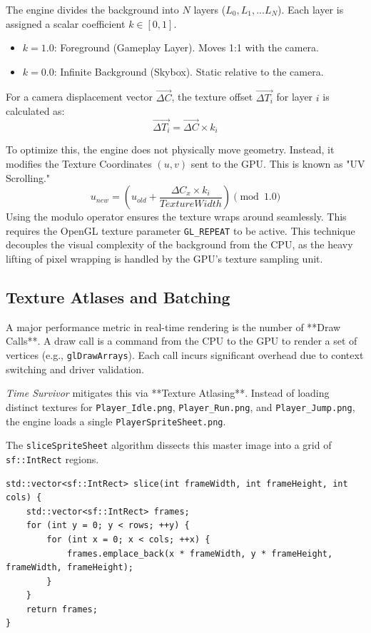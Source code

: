 \documentclass[10pt, a4paper]{article}
\begin{document}
The engine divides the background into $N$ layers ($L_0, L_1, ... L_N$). Each layer is assigned a scalar coefficient $k \in [0, 1]$.
\begin{itemize}
    \item $k=1.0$: Foreground (Gameplay Layer). Moves 1:1 with the camera.
    \item $k=0.0$: Infinite Background (Skybox). Static relative to the camera.
\end{itemize}

For a camera displacement vector $\vec{\Delta C}$, the texture offset $\vec{\Delta T_i}$ for layer $i$ is calculated as:
\begin{equation}
\vec{\Delta T_i} = \vec{\Delta C} \times k_i
\end{equation}

To optimize this, the engine does not physically move geometry. Instead, it modifies the Texture Coordinates $(u, v)$ sent to the GPU. This is known as "UV Scrolling." 
\begin{equation}
u_{new} = \left( u_{old} + \frac{\Delta C_x \times k_i}{TextureWidth} \right) \pmod{1.0}
\end{equation}
Using the modulo operator ensures the texture wraps around seamlessly. This requires the OpenGL texture parameter \texttt{GL\_REPEAT} to be active. This technique decouples the visual complexity of the background from the CPU, as the heavy lifting of pixel wrapping is handled by the GPU's texture sampling unit.

\subsection{Texture Atlases and Batching}
A major performance metric in real-time rendering is the number of **Draw Calls**. A draw call is a command from the CPU to the GPU to render a set of vertices (e.g., \texttt{glDrawArrays}). Each call incurs significant overhead due to context switching and driver validation.

\textit{Time Survivor} mitigates this via **Texture Atlasing**.
Instead of loading distinct textures for \texttt{Player\_Idle.png}, \texttt{Player\_Run.png}, and \texttt{Player\_Jump.png}, the engine loads a single \texttt{PlayerSpriteSheet.png}. 

The \texttt{sliceSpriteSheet} algorithm dissects this master image into a grid of \texttt{sf::IntRect} regions.
\begin{lstlisting}[style=cppstyle, caption={Theoretical Sprite Slicing Logic}]
std::vector<sf::IntRect> slice(int frameWidth, int frameHeight, int cols) {
    std::vector<sf::IntRect> frames;
    for (int y = 0; y < rows; ++y) {
        for (int x = 0; x < cols; ++x) {
            frames.emplace_back(x * frameWidth, y * frameHeight, frameWidth, frameHeight);
        }
    }
    return frames;
}
\end{lstlisting}
\end{document}
